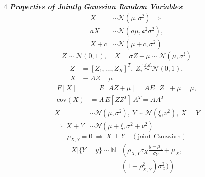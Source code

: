 \documentclass[12pt]{article}
\newcommand{\bulletPoint}[1]{\ul{\textit{\textbf{#1}}}}
\begin{document}
\begin{multicols*}{4}
\bulletPoint{Properties of Jointly Gaussian Random Variables}:
\useshortskip \begin{equation*}
    \begin{split}
        X&\sim\mathcal{N}(\mu,\sigma^2)\ \Rightarrow\\
        aX&\sim\mathcal{N}(a\mu,a^2\sigma^2),\\
        X+c&\sim\mathcal{N}(\mu+c,\sigma^2)
    \end{split}
\end{equation*}
\useshortskip \begin{equation*}
    Z\sim\mathcal{N}(0,1),\quad
    X=\sigma Z+\mu\sim\mathcal{N}(\mu,\sigma^2)
\end{equation*}
\useshortskip \begin{equation*}
    \begin{split}
        Z&=[Z_1,\ldots,Z_K]^T,\ 
        Z_i\overset{i.i.d.}{\sim}\mathcal{N}(0,1),\\
        X&=AZ+\mu
    \end{split}
\end{equation*}
\useshortskip \begin{equation*}
    \begin{split}
        E[X]&=E[AZ+\mu]=AE[Z]+\mu=\mu,\\
        \mathrm{cov}(X)&=A\,E[ZZ^T]\,A^T=AA^T
    \end{split}
\end{equation*}
\useshortskip \begin{equation*}
    \begin{split}
        X&\sim\mathcal{N}(\mu,\sigma^2),\ 
        Y\sim\mathcal{N}(\xi,\nu^2),\ X\perp Y\\
        \Rightarrow\ X+Y&\sim\mathcal{N}(\mu+\xi,\sigma^2+\nu^2)
    \end{split}
\end{equation*}
\useshortskip \begin{equation*}
    \rho_{X,Y}=0\ \Rightarrow\ X\perp Y\quad(\text{joint Gaussian})
\end{equation*}
\useshortskip \begin{equation*}
\begin{split}
 X|\{Y=y\} \sim \mathbb{N}&\left( \rho_{X,Y}\sigma_X\frac{y-\mu_Y}{\sigma_Y}+\mu_X,\right.\\
&\left. (1-\rho^2_{X,Y})\sigma^2_X ) \right)\\[-8pt]
\end{split}
\end{equation*}



\end{multicols*}
\end{document}
